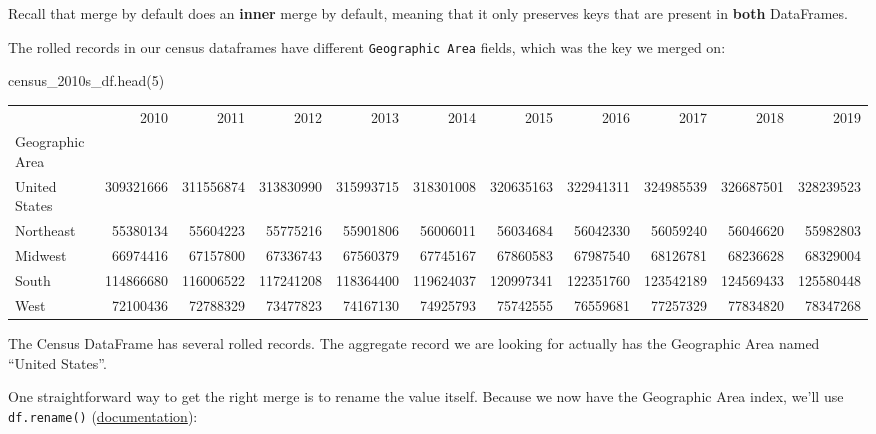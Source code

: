 \documentclass[
  letterpaper,
  DIV=11,
  numbers=noendperiod]{scrreprt}
\newenvironment{Shaded}{\begin{snugshade}}{\end{snugshade}}
\newcommand{\DecValTok}[1]{\textcolor[rgb]{0.68,0.00,0.00}{#1}}
\newcommand{\NormalTok}[1]{\textcolor[rgb]{0.00,0.23,0.31}{#1}}
\begin{document}
Recall that merge by default does an \textbf{inner} merge by default,
meaning that it only preserves keys that are present in \textbf{both}
DataFrames.

The rolled records in our census dataframes have different
\texttt{Geographic\ Area} fields, which was the key we merged on:

\begin{Shaded}
\begin{Highlighting}[]
\NormalTok{census\_2010s\_df.head(}\DecValTok{5}\NormalTok{)}
\end{Highlighting}
\end{Shaded}

\begin{tabular}{lrrrrrrrrrr}
\toprule
{} &       2010 &       2011 &       2012 &       2013 &       2014 &       2015 &       2016 &       2017 &       2018 &       2019 \\
Geographic Area &            &            &            &            &            &            &            &            &            &            \\
\midrule
United States   &  309321666 &  311556874 &  313830990 &  315993715 &  318301008 &  320635163 &  322941311 &  324985539 &  326687501 &  328239523 \\
Northeast       &   55380134 &   55604223 &   55775216 &   55901806 &   56006011 &   56034684 &   56042330 &   56059240 &   56046620 &   55982803 \\
Midwest         &   66974416 &   67157800 &   67336743 &   67560379 &   67745167 &   67860583 &   67987540 &   68126781 &   68236628 &   68329004 \\
South           &  114866680 &  116006522 &  117241208 &  118364400 &  119624037 &  120997341 &  122351760 &  123542189 &  124569433 &  125580448 \\
West            &   72100436 &   72788329 &   73477823 &   74167130 &   74925793 &   75742555 &   76559681 &   77257329 &   77834820 &   78347268 \\
\bottomrule
\end{tabular}

The Census DataFrame has several rolled records. The aggregate record we
are looking for actually has the Geographic Area named ``United
States''.

One straightforward way to get the right merge is to rename the value
itself. Because we now have the Geographic Area index, we'll use
\texttt{df.rename()}
(\href{https://pandas.pydata.org/docs/reference/api/pandas.DataFrame.rename.html}{documentation}):
\end{document}
